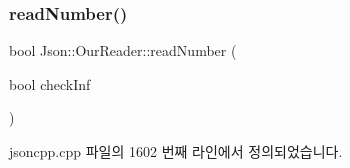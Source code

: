 \mbox{\label{class_json_1_1_our_reader_aefcb9a78cc45870ccac2db2a66c8ec50}} 
\subsubsection{\texorpdfstring{read\+Number()}{readNumber()}}
{\footnotesize\ttfamily bool Json\+::\+Our\+Reader\+::read\+Number (\begin{DoxyParamCaption}\item[{bool}]{check\+Inf }\end{DoxyParamCaption})\hspace{0.3cm}{\ttfamily [private]}}



jsoncpp.\+cpp 파일의 1602 번째 라인에서 정의되었습니다.


